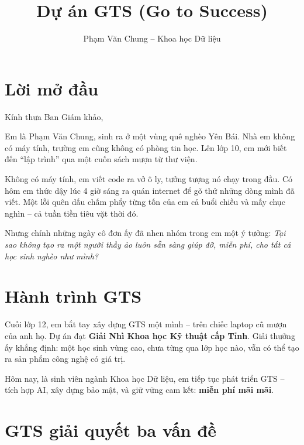 \documentclass[12pt,a4paper]{article}
\title{\textbf{Dự án GTS (Go to Success)}}
\author{Phạm Văn Chung -- Khoa học Dữ liệu}
\date{}
\begin{document}
\maketitle



\section*{Lời mở đầu}



Kính thưa Ban Giám khảo,


Em là Phạm Văn Chung, sinh ra ở một vùng quê nghèo Yên Bái. Nhà em không có máy tính, trường em cũng không có phòng tin học. Lên lớp 10, em mới biết đến ``lập trình'' qua một cuốn sách mượn từ thư viện.


Không có máy tính, em viết code ra vở ô ly, tưởng tượng nó chạy trong đầu. Có hôm em thức dậy lúc 4 giờ sáng ra quán internet để gõ thử những dòng mình đã viết. Một lỗi quên dấu chấm phẩy từng tốn của em cả buổi chiều và mấy chục nghìn -- cả tuần tiền tiêu vặt thời đó.


Nhưng chính những ngày cô đơn ấy đã nhen nhóm trong em một ý tưởng: \textit{Tại sao không tạo ra một người thầy ảo luôn sẵn sàng giúp đỡ, miễn phí, cho tất cả học sinh nghèo như mình?}


\section*{Hành trình GTS}


Cuối lớp 12, em bắt tay xây dựng GTS một mình -- trên chiếc laptop cũ mượn của anh họ. Dự án đạt \textbf{Giải Nhì Khoa học Kỹ thuật cấp Tỉnh}. Giải thưởng ấy khẳng định: một học sinh vùng cao, chưa từng qua lớp học nào, vẫn có thể tạo ra sản phẩm công nghệ có giá trị.


Hôm nay, là sinh viên ngành Khoa học Dữ liệu, em tiếp tục phát triển GTS -- tích hợp AI, xây dựng bảo mật, và giữ vững cam kết: \textbf{miễn phí mãi mãi}.


\section*{GTS giải quyết ba vấn đề}
\end{document}
